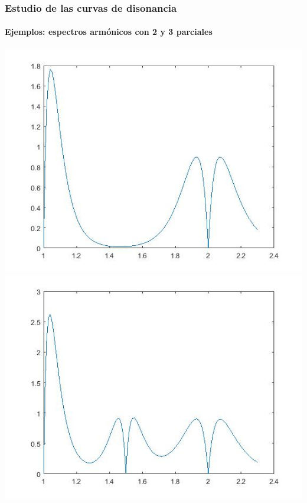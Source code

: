 \documentclass[12 pt]{beamer}
\begin{document}
\begin{frame}{20}
    \frametitle{Estudio de las curvas de disonancia}
    
    \framesubtitle{Ejemplos: espectros armónicos con 2 y 3 parciales}
    \begin{center}
        \includegraphics[scale = .30]{Espectro1_2}
        \includegraphics[scale = .30]{Espectro1_3}
    \end{center}
\end{frame}
\end{document}
